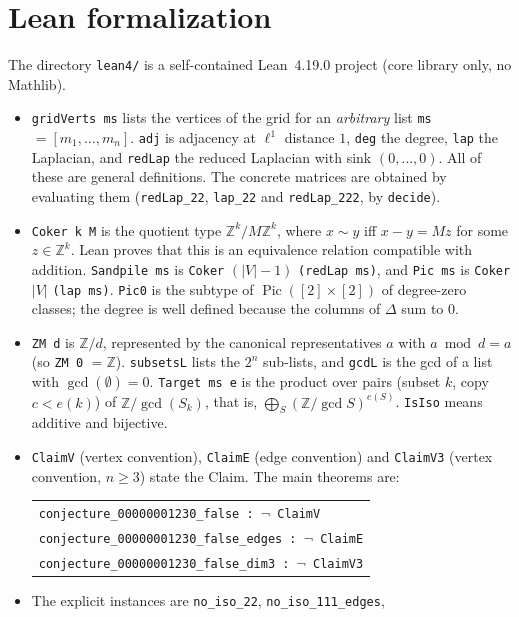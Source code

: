 \documentclass[11pt]{article}
\theoremstyle{definition}
\theoremstyle{remark}
\newcommand{\Z}{\mathbb{Z}}
\newcommand{\Pic}{\operatorname{Pic}}
\begin{document}
\section{Lean formalization}
The directory \texttt{lean4/} is a self-contained Lean~4.19.0 project (core
library only, no Mathlib).
\begin{itemize}\raggedright
\item \texttt{gridVerts ms} lists the vertices of the grid for an
\emph{arbitrary} list \texttt{ms} $=[m_1,\dots,m_n]$. \texttt{adj} is
adjacency at $\ell^1$ distance $1$, \texttt{deg} the degree, \texttt{lap} the
Laplacian, and \texttt{redLap} the reduced Laplacian with sink $(0,\dots,0)$.
All of these are general definitions. The concrete matrices are obtained by
evaluating them (\texttt{redLap\_22}, \texttt{lap\_22} and \texttt{redLap\_222},
by \texttt{decide}).
\item \texttt{Coker k M} is the quotient type $\Z^k/M\Z^k$, where $x\sim y$
iff $x-y=Mz$ for some $z\in\Z^k$. Lean proves that this is an equivalence
relation compatible with addition. \texttt{Sandpile ms} is
\texttt{Coker} $(|V|-1)$ \texttt{(redLap ms)}, and \texttt{Pic ms} is
\texttt{Coker} $|V|$ \texttt{(lap ms)}. \texttt{Pic0} is the subtype of
$\Pic([2]\times[2])$ of degree-zero classes; the degree is well defined because
the columns of $\Delta$ sum to $0$.
\item \texttt{ZM d} is $\Z/d$, represented by the canonical representatives
$a$ with $a\bmod d=a$ (so \texttt{ZM 0} $=\Z$). \texttt{subsetsL} lists the
$2^n$ sub-lists, and \texttt{gcdL} is the gcd of a list with
$\gcd(\emptyset)=0$. \texttt{Target ms e} is the product over pairs
(subset $k$, copy $c<e(k)$) of $\Z/\gcd(S_k)$, that is,
$\bigoplus_S(\Z/\gcd S)^{e(S)}$. \texttt{IsIso} means additive and bijective.
\item \texttt{ClaimV} (vertex convention), \texttt{ClaimE} (edge convention)
and \texttt{ClaimV3} (vertex convention, $n\ge3$) state the Claim. The main
theorems are:
\begin{center}
\begin{tabular}{l}
\texttt{conjecture\_00000001230\_false : $\neg$ ClaimV}\\
\texttt{conjecture\_00000001230\_false\_edges : $\neg$ ClaimE}\\
\texttt{conjecture\_00000001230\_false\_dim3 : $\neg$ ClaimV3}
\end{tabular}
\end{center}
\item The explicit instances are \texttt{no\_iso\_22}, \texttt{no\_iso\_111\_edges},

\end{itemize}
\end{document}
